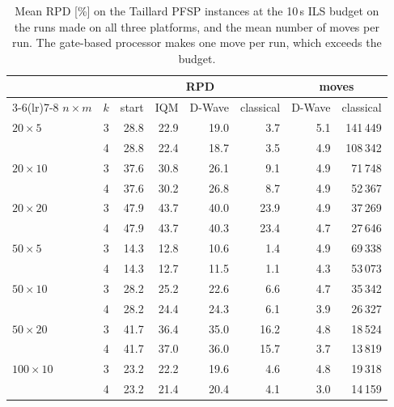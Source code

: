 \documentclass[letterpaper]{article} %
\theoremstyle{definition}
\begin{document}
\begin{table}[t]
\centering
\small
\setlength{\tabcolsep}{3pt}
\begin{tabular}{@{}lcrrrrrr@{}}
\toprule
 & & \multicolumn{4}{c}{RPD} & \multicolumn{2}{c}{moves} \\
\cmidrule(lr){3-6}\cmidrule(lr){7-8}
$n\times m$ & $k$ & start & IQM & D-Wave & classical & D-Wave & classical \\
\midrule
$20\times 5$   & 3 & 28.8 & 22.9 & 19.0 & 3.7  & 5.1 & 141\,449 \\
               & 4 & 28.8 & 22.4 & 18.7 & 3.5  & 4.9 & 108\,342 \\
$20\times 10$  & 3 & 37.6 & 30.8 & 26.1 & 9.1  & 4.9 & 71\,748 \\
               & 4 & 37.6 & 30.2 & 26.8 & 8.7  & 4.9 & 52\,367 \\
$20\times 20$  & 3 & 47.9 & 43.7 & 40.0 & 23.9 & 4.9 & 37\,269 \\
               & 4 & 47.9 & 43.7 & 40.3 & 23.4 & 4.7 & 27\,646 \\
$50\times 5$   & 3 & 14.3 & 12.8 & 10.6 & 1.4  & 4.9 & 69\,338 \\
               & 4 & 14.3 & 12.7 & 11.5 & 1.1  & 4.3 & 53\,073 \\
$50\times 10$  & 3 & 28.2 & 25.2 & 22.6 & 6.6  & 4.7 & 35\,342 \\
               & 4 & 28.2 & 24.4 & 24.3 & 6.1  & 3.9 & 26\,327 \\
$50\times 20$  & 3 & 41.7 & 36.4 & 35.0 & 16.2 & 4.8 & 18\,524 \\
               & 4 & 41.7 & 37.0 & 36.0 & 15.7 & 3.7 & 13\,819 \\
$100\times 10$ & 3 & 23.2 & 22.2 & 19.6 & 4.6  & 4.8 & 19\,318 \\
               & 4 & 23.2 & 21.4 & 20.4 & 4.1  & 3.0 & 14\,159 \\
\bottomrule
\end{tabular}
\caption{Mean RPD [\%] on the Taillard PFSP instances at the 10\,s ILS budget on the runs made on all three
platforms, and the mean number of moves per run. The gate-based
processor makes one move per run, which exceeds the budget.}
\label{tab:quantum}
\end{table}
\end{document}
